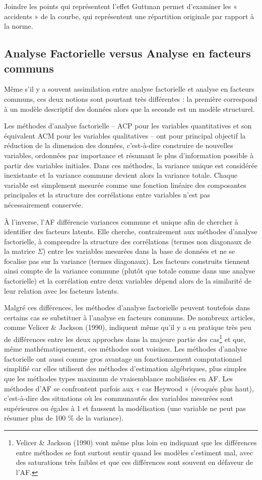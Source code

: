 \documentclass[12pt,a4paper]{reedthesis}
\begin{document}
Joindre les points qui représentent l'effet Guttman permet d'examiner les « accidents » de la courbe, qui représentent une répartition originale par rapport à la norme.

\hypertarget{sec:annexeAFACMcompa}{%
\subsection{Analyse Factorielle versus Analyse en facteurs communs}\label{sec:annexeAFACMcompa}}

Même s'il y a souvent assimilation entre analyse factorielle et analyse en facteurs communs, ces deux notions sont pourtant très différentes : la première correspond à un modèle descriptif des données alors que la seconde est un modèle structurel.

Les méthodes d'analyse factorielle -- ACP pour les variables quantitatives et son équivalent ACM pour les variables qualitatives -- ont pour principal objectif la réduction de la dimension des données, c'est-à-dire construire de nouvelles variables, ordonnées par importance et résumant le plus d'information possible à partir des variables initiales. Dans ces méthodes, la variance unique est considérée inexistante et la variance commune devient alors la variance totale. Chaque variable est simplement mesurée comme une fonction linéaire des composantes principales et la structure des corrélations entre variables n'est pas nécessairement conservée.

À l'inverse, l'AF différencie variances commune et unique afin de chercher à identifier des facteurs latents. Elle cherche, contrairement aux méthodes d'analyse factorielle, à comprendre la structure des corrélations (termes non diagonaux de la matrice \(\Sigma\)) entre les variables mesurées dans la base de données et ne se focalise pas sur la variance (termes diagonaux). Les facteurs construits tiennent ainsi compte de la variance commune (plutôt que totale comme dans une analyse factorielle) et la corrélation entre deux variables dépend alors de la similarité de leur relation avec les facteurs latents.

Malgré ces différences, les méthodes d'analyse factorielle peuvent toutefois dans certains cas se substituer à l'analyse en facteurs communs. De nombreux articles, comme Velicer \& Jackson (1990), indiquent même qu'il y a en pratique très peu de différences entre les deux approches dans la majeure partie des cas\footnote{Velicer \& Jackson (1990) vont même plus loin en indiquant que les différences entre méthodes se font surtout sentir quand les modèles s'estiment mal, avec des saturations très faibles et que ces différences sont souvent en défaveur de l'AF.} et que, même mathématiquement, ces méthodes sont voisines. Les méthodes d'analyse factorielle ont aussi comme gros avantage un fonctionnement computationnel simplifié car elles utilisent des méthodes d'estimation algébriques, plus simples que les méthodes types maximum de vraisemblance mobilisées en AF. Les méthodes d'AF se confrontent parfois aux « cas Heywood » (évoqués plus haut), c'est-à-dire des situations où les communautés des variables mesurées sont supérieures ou égales à 1 et faussent la modélisation (une variable ne peut pas résumer plus de 100 \% de la variance).
\end{document}
